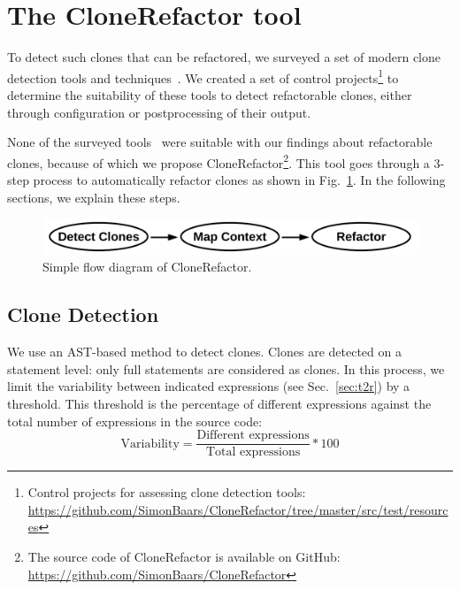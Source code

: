 \documentclass[sigconf,review, table]{acmart}
\begin{document}
\section{The CloneRefactor tool}
To detect such clones that can be refactored, we surveyed a set of modern clone detection tools and techniques~\cite{svajlenko2014evaluating, sheneamer2016survey, gautam2016various, roy2009comparison}. We created a set of control projects\footnote{Control projects for assessing clone detection tools: \url{https://github.com/SimonBaars/CloneRefactor/tree/master/src/test/resources}} to determine the suitability of these tools to detect refactorable clones, either through configuration or postprocessing of their output.

None of the surveyed tools~\cite{ragkhitwetsagul2019siamese, roy2008nicad, semura2017ccfindersw, sajnani2016sourcerercc, saini2018oreo, jiang2007deckard, kamalpriya2017enhancing, mazinanian2016jdeodorant} were suitable with our findings about refactorable clones, because of which we propose CloneRefactor\footnote{The source code of CloneRefactor is available on GitHub: \url{https://github.com/SimonBaars/CloneRefactor}}. This tool goes through a 3-step process to automatically refactor clones as shown in Fig.~\ref{fig:clonerefactorflow}. In the following sections, we explain these steps.
\begin{figure}[H]
  \includegraphics[width=1\columnwidth]{img/flow}
  \caption{Simple flow diagram of CloneRefactor.}
  \label{fig:clonerefactorflow}
\end{figure}

\subsection{Clone Detection}
We use an AST-based method to detect clones. Clones are detected on a statement level: only full statements are considered as clones. In this process, we limit the variability between indicated expressions (see Sec.~\ref{sec:t2r}) by a threshold. This threshold is the percentage of different expressions against the total number of expressions in the source code:
\begin{equation}\label{eq:type2r}
\text{Variability}=\frac{\text{Different expressions}}{\text{Total expressions}}*100
\end{equation}
\end{document}
